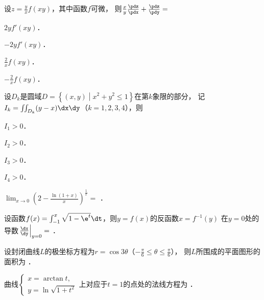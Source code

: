 \documentclass[plain,noanswer,medmath]{../../template/jnuexam}
\begin{document}
\begin{problem}
设$z = \frac{y}{x}f(xy)$，其中函数$f$可微，
则$\frac{x}{y}\frac{\pdz}{\pdx} + \frac{\pdz}{\pdy} =$\pickout{}
\begin{abcd}
\item $2yf'(xy)$．
\item $- 2yf'(xy)$．
\item $\frac{2}{x}f(xy)$．
\item $- \frac{2}{x}f(xy)$．
\end{abcd}
\end{problem}


\begin{problem}
设$D_k$是圆域$D = \left\{(x,y)\middle|x^2 + y^2 \le 1 \right\}$在第$k$象限的部分，
记\goodbreak$I_k = \iint_{D_k} (y - x)\dx\dy$（$k = 1,2,3,4$），则\pickout{}
\begin{abcd}
\item $I_1 > 0$．
\item $I_2 > 0$．
\item $I_3 > 0$．
\item $I_4 > 0$．
\end{abcd}
\end{problem}








\begin{problem}
$\lim_{x \to 0} \left(2 - \frac{\ln(1 + x)}{x} \right)^{\frac{1}{x}} =$ \fillin{}．
\end{problem}


\begin{problem}
设函数$f(x) = \int_{-1}^x \sqrt{1 - \e^t} \dt$，则$y = f(x)$的反函数$x = f^{-1}(y)$
在$y = 0$处的导数$\left. \frac{\dx}{\dy} \right|_{y = 0} =$ \fillin{}．
\end{problem}


\begin{problem}
设封闭曲线$L$的极坐标方程为$r = \cos 3\theta$（$- \frac{\pi}{6} \le \theta \le \frac{\pi}{6}$），
则$L$所围成的平面图形的面积为 \fillin{}．
\end{problem}


\begin{problem}
曲线$\begin{cases}
  x = \arctan t, \\
  y = \ln \sqrt{1 + t^2}
\end{cases}$上对应于$t = 1$的点处的法线方程为 \fillin{}．
\end{problem}
\end{document}
